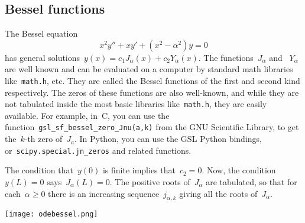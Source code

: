 \subsection{Bessel functions}

The Bessel equation
\begin{equation}\label{eq:bessel}
	x^2y''+xy'+(x^2-\alpha^2)y = 0
\end{equation}
has general solutions~$y(x)=c_1 J_{\alpha}(x)+c_2 Y_{\alpha}(x)$.
The functions~$J_\alpha$ and ~$Y_\alpha$ are well known and can be
evaluated on a computer by standard math libraries
like~\verb+math.h+, etc.
They are called the Bessel functions of the first and second kind
respectively.  The zeros of these functions are also well-known, and
while they are not tabulated inside the most basic libraries
like~\verb+math.h+, they are easily available.  For example,
in~C, you can use the function~\verb+gsl_sf_bessel_zero_Jnu(a,k)+ from the
GNU Scientific Library, to get the~$k$-th zero of~$J_a$.  In Python,
you can use the GSL Python bindings, or~\verb+scipy.special.jn_zeros+
and related functions.

The condition that~$y(0)$ is finite implies that~$c_2=0$.  Now, the
condition~$y(L)=0$ says~$J_\alpha(L)=0$.  The positive roots of~$J_\alpha$ are
tabulated, so that for each~$\alpha\ge 0$ there is an increasing
sequence~$j_{\alpha,k}$ giving all the roots of~$J_\alpha$.

\texttt{[image: odebessel.png]}

